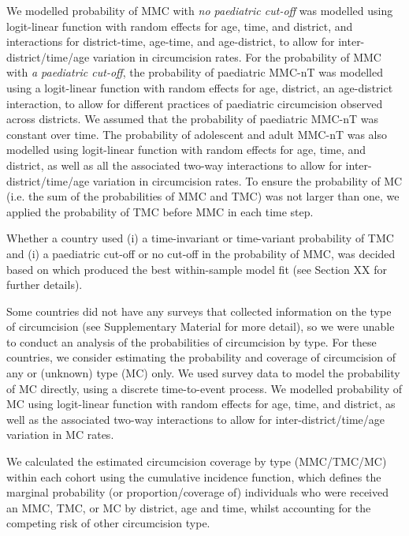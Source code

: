 \documentclass{article}
\begin{document}
We modelled probability of MMC with {\it no paediatric cut-off} was modelled using logit-linear function with random effects for age, time, and district, and interactions for district-time, age-time, and age-district, to allow for inter-district/time/age variation in circumcision rates. For the probability of MMC with {\it a paediatric cut-off}, the probability of paediatric MMC-nT was modelled using a logit-linear function with random effects for age, district, an age-district interaction, to allow for different practices of paediatric circumcision observed across districts. We assumed that the probability of paediatric MMC-nT was constant over time. The probability of adolescent and adult MMC-nT was also modelled using logit-linear function with random effects for age, time, and district, as well as all the associated two-way interactions to allow for inter-district/time/age variation in circumcision rates. To ensure the probability of MC (i.e. the sum of the probabilities of MMC and TMC) was not larger than one, we applied the probability of TMC before MMC in each time step.

Whether a country used (i) a time-invariant or time-variant probability of TMC and (i) a paediatric cut-off or no cut-off in the probability of MMC, was decided based on which produced the best within-sample model fit (see Section XX for further details). 

Some countries did not have any surveys that collected information on the type of circumcision (see Supplementary Material for more detail), so we were unable to conduct an analysis of the probabilities of circumcision by type. For these countries, we consider estimating the probability and coverage of circumcision of any or (unknown) type (MC) only. We used survey data to model the probability of MC directly, using a discrete time-to-event process. We modelled probability of MC using logit-linear function with random effects for age, time, and district, as well as the associated two-way interactions to allow for inter-district/time/age variation in MC rates. 

We calculated the estimated circumcision coverage by type (MMC/TMC/MC) within each cohort using the cumulative incidence function, which defines the marginal probability (or proportion/coverage of) individuals who were received an MMC, TMC, or MC by district, age and time, whilst accounting for the competing risk of other circumcision type.
\end{document}
